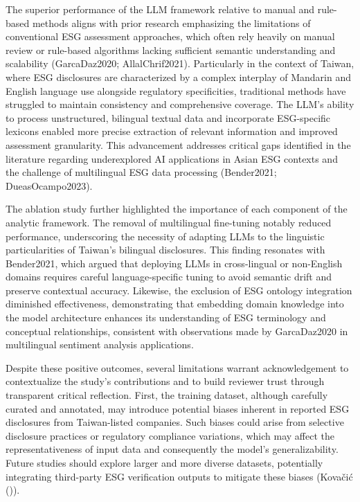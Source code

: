 \documentclass[
  12pt,
]{article}
\begin{document}
The superior performance of the LLM framework relative to manual and
rule-based methods aligns with prior research emphasizing the
limitations of conventional ESG assessment approaches, which often rely
heavily on manual review or rule-based algorithms lacking sufficient
semantic understanding and scalability (GarcaDaz2020; AllalChrif2021).
Particularly in the context of Taiwan, where ESG disclosures are
characterized by a complex interplay of Mandarin and English language
use alongside regulatory specificities, traditional methods have
struggled to maintain consistency and comprehensive coverage. The LLM's
ability to process unstructured, bilingual textual data and incorporate
ESG-specific lexicons enabled more precise extraction of relevant
information and improved assessment granularity. This advancement
addresses critical gaps identified in the literature regarding
underexplored AI applications in Asian ESG contexts and the challenge of
multilingual ESG data processing (Bender2021; DueasOcampo2023).

The ablation study further highlighted the importance of each component
of the analytic framework. The removal of multilingual fine-tuning
notably reduced performance, underscoring the necessity of adapting LLMs
to the linguistic particularities of Taiwan's bilingual disclosures.
This finding resonates with Bender2021, which argued that deploying LLMs
in cross-lingual or non-English domains requires careful
language-specific tuning to avoid semantic drift and preserve contextual
accuracy. Likewise, the exclusion of ESG ontology integration diminished
effectiveness, demonstrating that embedding domain knowledge into the
model architecture enhances its understanding of ESG terminology and
conceptual relationships, consistent with observations made by
GarcaDaz2020 in multilingual sentiment analysis applications.

Despite these positive outcomes, several limitations warrant
acknowledgement to contextualize the study's contributions and to build
reviewer trust through transparent critical reflection. First, the
training dataset, although carefully curated and annotated, may
introduce potential biases inherent in reported ESG disclosures from
Taiwan-listed companies. Such biases could arise from selective
disclosure practices or regulatory compliance variations, which may
affect the representativeness of input data and consequently the model's
generalizability. Future studies should explore larger and more diverse
datasets, potentially integrating third-party ESG verification outputs
to mitigate these biases (Kovačić ()).
\end{document}
